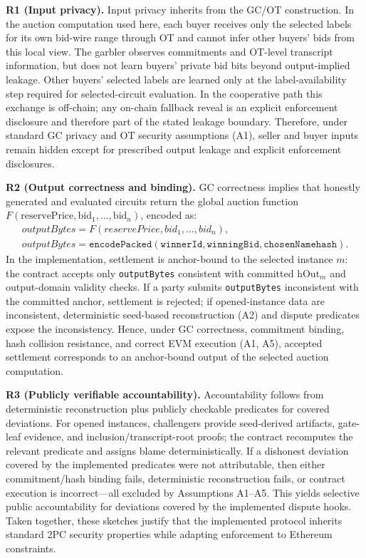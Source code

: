 \documentclass[final,twoside]{vutinfth}
\begin{document}
\textbf{R1 (Input privacy).}
Input privacy inherits from the GC/OT construction.
In the auction computation used here, each buyer receives only the selected labels for
its own bid-wire range through OT and cannot infer other buyers' bids from this
local view. The garbler observes commitments and OT-level transcript
information, but does not learn buyers' private bid bits beyond output-implied
leakage.
Other buyers' selected labels are learned only at the label-availability step
required for selected-circuit evaluation. In the cooperative path this exchange
is off-chain; any on-chain fallback reveal is an explicit enforcement
disclosure and therefore part of the stated leakage boundary.
Therefore, under standard GC privacy and OT security assumptions (A1), seller
and buyer inputs remain hidden except for prescribed output leakage and explicit
enforcement disclosures.

\textbf{R2 (Output correctness and binding).}
GC correctness implies that honestly generated and evaluated circuits return
the global auction function
$F(\mathrm{reservePrice},\mathrm{bid}_1,\dots,\mathrm{bid}_n)$, encoded as:
\[
\begin{array}{l}
outputBytes = F(reservePrice, bid_1, \ldots, bid_n), \\
outputBytes = \texttt{encodePacked}(\texttt{winnerId}, \texttt{winningBid}, \texttt{chosenNamehash}).
\end{array}
\]
In the implementation, settlement is anchor-bound to the selected instance
$m$: the contract accepts only \texttt{outputBytes} consistent with committed
$\mathrm{hOut}_m$ and output-domain validity checks.
If a party submits \texttt{outputBytes} inconsistent with the committed anchor,
settlement is rejected; if opened-instance data are inconsistent, deterministic
seed-based reconstruction (A2) and dispute predicates expose the inconsistency.
Hence, under GC correctness, commitment binding, hash collision resistance, and
correct EVM execution (A1, A5), accepted settlement corresponds to an
anchor-bound output of the selected auction computation.

\textbf{R3 (Publicly verifiable accountability).}
Accountability follows from deterministic reconstruction plus publicly
checkable predicates for covered deviations.
For opened instances, challengers provide seed-derived artifacts, gate-leaf
evidence, and inclusion/transcript-root proofs; the contract recomputes the
relevant predicate and assigns blame deterministically.
If a dishonest deviation covered by the implemented predicates were not
attributable, then either commitment/hash binding fails, deterministic
reconstruction fails, or contract execution is incorrect---all excluded by
Assumptions A1--A5.
This yields selective public accountability for deviations covered by the
implemented dispute hooks.
Taken together, these sketches justify that the implemented protocol inherits
standard 2PC security properties while adapting enforcement to Ethereum
constraints.
\end{document}
